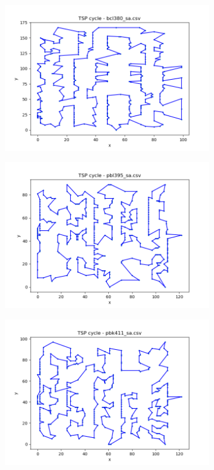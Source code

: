 \documentclass[12pt]{article}
\begin{document}
\begin{figure}[htpb]
\begin{subfigure}[b]{0.475\textwidth}
                \includegraphics[width=\linewidth]{img/bcl380_sa.png}
            \end{subfigure}
            \hfill
            \begin{subfigure}[b]{0.475\textwidth}
                \includegraphics[width=\linewidth]{img/pbl395_sa.png}
            \end{subfigure}
            \begin{subfigure}[b]{0.475\textwidth}
                \includegraphics[width=\linewidth]{img/pbk411_sa.png}

\end{subfigure}
\end{figure}
\end{document}
